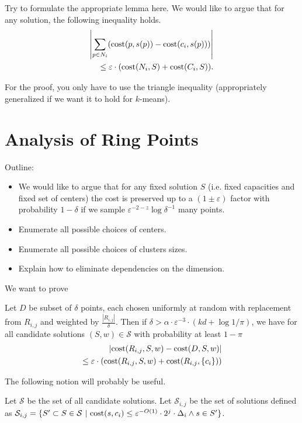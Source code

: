 Try to formulate the appropriate lemma here. We would like to argue that for any solution, the following inequality holds.
\begin{eqnarray*}
\left\vert\sum_{p\in N_i} (\text{cost}(p,s(p)) - \text{cost}(c_i,s(p))) \right\vert \\
\leq \varepsilon \cdot (\text{cost}(N_i,S) + \text{cost}(C_i,S)).
\end{eqnarray*}

For the proof, you only have to use the triangle inequality (appropriately generalized if we want it to hold for $k$-means).


\section{Analysis of Ring Points} 

Outline:

\begin{itemize}
\item We would like to argue that for any fixed solution $S$ (i.e. fixed capacities and fixed set of centers) the cost is preserved up to a $(1\pm \varepsilon)$ factor with probability $1-\delta$ if we sample $\varepsilon^{-2-z}\log \delta^{-1}$ many points.
\item Enumerate all possible choices of centers. 
\item Enumerate all possible choices of clusters sizes. 
\item Explain how to eliminate dependencies on the dimension.
\end{itemize}

We want to prove
\begin{lemma}
Let $D$ be subset of $\delta$ points, each chosen uniformly at random with replacement from $R_{i,j}$ and weighted by $\frac{|R_{i,j}|}{\delta}$. Then if $\delta > \alpha\cdot \varepsilon^{-3}\cdot (kd + \log 1/\pi)$, we have for all candidate solutions $(S,w)\in \mathcal{S}$ with probability at least $1-\pi$
\begin{eqnarray*}
|\text{cost}(R_{i,j},S,w)-\text{cost}(D,S,w)|\\
\leq \varepsilon\cdot \left(\text{cost}(R_{i,j},S,w) + \text{cost}(R_{i,j},\{c_i\})\right)
\end{eqnarray*}
\end{lemma}


The following notion will probably be useful.

Let $\mathcal{S}$ be the set of all candidate solutions. Let $\mathcal{S}_{i,j}$ be the set of solutions defined as $\mathcal{S}_{i,j} = \{S'\subset S\in \mathcal{S}~|~\text{cost}(s,c_i)\leq \varepsilon^{-O(1)}\cdot 2^j\cdot \Delta_i \wedge s\in S'\}$.

